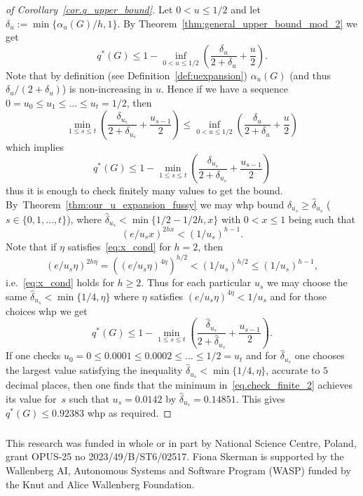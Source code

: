 \documentclass[runningheads, envcountsame, smallextended]{llncs}
\newcommand{\q}{q^*}
\numberwithin{theorem}{section}
\numberwithin{definition}{section}
\numberwithin{lemma}{section}
\numberwithin{corollary}{section}
\numberwithin{proposition}{section}
\numberwithin{conjecture}{section}
\numberwithin{remark}{section}
\numberwithin{equation}{section}
\begin{document}
\begin{proof}[of Corollary~\ref{cor.q_upper_bound}]
    Let $0 < u\leq 1/2$ and let 
    $\delta_u:= \min\{\alpha_u(G)/h,1\}$. 
	By Theorem~\ref{thm:general_upper_bound_mod_2} we get
	\[
		q^*(G) \leq 1- \inf_{0 < u \leq 1/2} \left(\frac{\delta_u}{2+\delta_u} + \frac{u}{2}\right).
	\]
	Note that by definition (see Definition~\ref{def:uexpansion}) $\alpha_u(G)$ (and thus ${\delta}_u/(2+{\delta}_{u})$) is non-increasing in $u$.
	Hence if we have a sequence $0=u_0 \leq u_1 \leq \ldots \leq u_t = 1/2$, then
	\[
		\min_{1\leq s \leq t} \left( \frac{{\delta}_{u_s}}{2+{\delta}_{u_s}}+ \frac{u_{s-1}}{2}\right) \leq \inf_{0 < u \leq 1/2} \left( \frac{{\delta}_{u}}{2+{\delta}_{u}} + \frac{u}{2}\right)
	\]
	which implies
	\[
		q^*(G) \leq 1-	\min_{1\leq s \leq t} \left( \frac{{\delta}_{u_s}}{2+{\delta}_{u_s}}+ \frac{u_{s-1}}{2}\right)
	\]
	thus it is enough to check finitely many values to get the bound. By~Theorem~\ref{thm:our_u_expansion_fussy} we may whp bound
	$\delta_{u_s} \geq \hat{\delta}_{u_s}$ ($s \in \{0,1,\ldots,t\}$), where $\hat{\delta}_{u_s} < \min\{1/2- 1/2h, x\}$  with $0 < x \leq 1$ being such that \begin{equation}\label{eq:x_cond}(e/u_s x)^{2h x} < (1/u_s)^{h-1}.\end{equation} 
    Note that if $\eta$ satisfies~\eqref{eq:x_cond} for $h=2$, 
    then \[(e/u_s \eta)^{2h \eta} = \left( (e/u_s \eta)^{4 \eta}\right)^{h/2} < (1/u_s)^{h/2} \leq (1/u_s)^{h-1},\] i.e.~\eqref{eq:x_cond} holds for $h\geq 2$. Thus for each particular $u_s$ we may choose the same $\hat{\delta}_{u_s}< \min\{1/4, \eta \}$ 
    where  $\eta$ satisfies $(e/u_s \eta)^{4 \eta} < 1/u_s$ and for those choices whp we get
	\begin{equation} \label{eq.check_finite_2}
		q^*(G) \leq 1-	\min_{1\leq s \leq t} \left( \frac{{\hat\delta}_{u_s}}{2+{\hat\delta}_{u_s}}+ \frac{u_{s-1}}{2}\right).
	\end{equation}
	If one checks $u_0=0\leq 0.0001\leq 0.0002 \leq \ldots \leq 1/2=u_t$ and for $\hat{\delta}_{u_s}$ one chooses the largest value satisfying the inequality $\hat{\delta}_{u_s}< \min\{1/4, \eta \}$, accurate to $5$ decimal places, then one finds that 
	the minimum in~\eqref{eq.check_finite_2} achieves its value for~$s$ such that $u_s=0.0142$ by ${\hat\delta}_{u_s} = 0.14851$. This gives $\q(G)\leq 0.92383$ whp as required. 
\end{proof}



\begin{credits}
\subsubsection{\ackname} This research was funded in whole or in part by National Science Centre, Poland, grant OPUS-25 no 2023/49/B/ST6/02517. Fiona Skerman is supported by the Wallenberg AI, Autonomous Systems and Software Program (WASP) funded by the Knut and Alice Wallenberg Foundation.
\end{credits}
\end{document}
